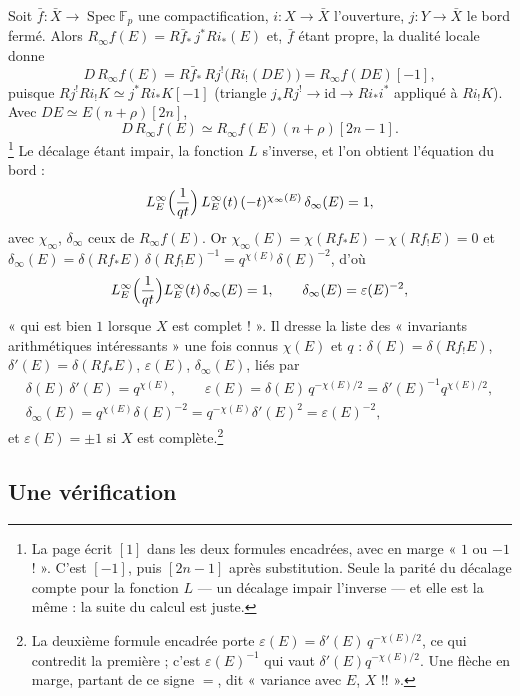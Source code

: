 \documentclass[11pt,a4paper]{article}
\begin{document}
Soit $\bar f : \bar X \to \operatorname{Spec}\mathbb{F}_p$ une compactification,
$i : X \to \bar X$ l'ouverture, $j : Y \to \bar X$ le bord fermé. Alors
$R_\infty f(E) = R\bar f_{*}\,j^{*}Ri_{*}(E)$ et, $\bar f$ étant propre, la
dualité locale donne
\[
  D\,R_\infty f(E) = R\bar f_{*}\,Rj^{!}\bigl(Ri_{!}(DE)\bigr)
  = R_\infty f(DE)[-1],
\]
puisque $Rj^{!}Ri_{!}K \simeq j^{*}Ri_{*}K[-1]$ (triangle
$j_{*}Rj^{!} \to \mathrm{id} \to Ri_{*}i^{*}$ appliqué à $Ri_{!}K$). Avec
$DE \simeq E(n+\rho)[2n]$,
\[
  D\,R_\infty f(E) \simeq R_\infty f(E)(n + \rho)[2n - 1] .
\]
\footnote{La page écrit $[1]$ dans les deux formules encadrées, avec en marge
« $1$ ou $-1$ ! ». C'est $[-1]$, puis $[2n-1]$ après substitution. Seule la
parité du décalage compte pour la fonction $L$ --- un décalage impair
l'inverse --- et elle est la même : la suite du calcul est juste.} Le décalage
étant impair, la fonction $L$ s'inverse, et l'on obtient l'équation du bord :
\[
  L^{\infty}_E\Bigl(\frac{1}{qt}\Bigr)\,L^{\infty}_E(t)\,(-t)^{\chi_\infty(E)}\,\delta_\infty(E) = 1,
\]
avec $\chi_\infty$, $\delta_\infty$ ceux de $R_\infty f(E)$. Or
$\chi_\infty(E) = \chi(Rf_{*}E) - \chi(Rf_{!}E) = 0$ et
$\delta_\infty(E) = \delta(Rf_{*}E)\,\delta(Rf_{!}E)^{-1} = q^{\chi(E)}\delta(E)^{-2}$,
d'où
\[
  L^{\infty}_E\Bigl(\frac{1}{qt}\Bigr)L^{\infty}_E(t)\,\delta_\infty(E) = 1,
  \qquad \delta_\infty(E) = \varepsilon(E)^{-2},
\]
« qui est bien $1$ lorsque $X$ est complet ! ». Il dresse la liste des
« invariants arithmétiques intéressants » une fois connus $\chi(E)$ et $q$ :
$\delta(E) = \delta(Rf_{!}E)$, $\delta'(E) = \delta(Rf_{*}E)$,
$\varepsilon(E)$, $\delta_\infty(E)$, liés par
\[
  \begin{gathered}
  \delta(E)\,\delta'(E) = q^{\chi(E)}, \qquad
  \varepsilon(E) = \delta(E)\,q^{-\chi(E)/2} = \delta'(E)^{-1}q^{\chi(E)/2},\\
  \delta_\infty(E) = q^{\chi(E)}\delta(E)^{-2} = q^{-\chi(E)}\delta'(E)^{2} = \varepsilon(E)^{-2},
  \end{gathered}
\]
et $\varepsilon(E) = \pm 1$ si $X$ est complète.\footnote{La deuxième formule
encadrée porte $\varepsilon(E) = \delta'(E)\,q^{-\chi(E)/2}$, ce qui
contredit la première ; c'est $\varepsilon(E)^{-1}$ qui vaut
$\delta'(E)q^{-\chi(E)/2}$. Une flèche en marge, partant de ce signe $=$, dit
« variance avec $E$, $X$ !! ».}

\subsection*{Une vérification}
\end{document}
